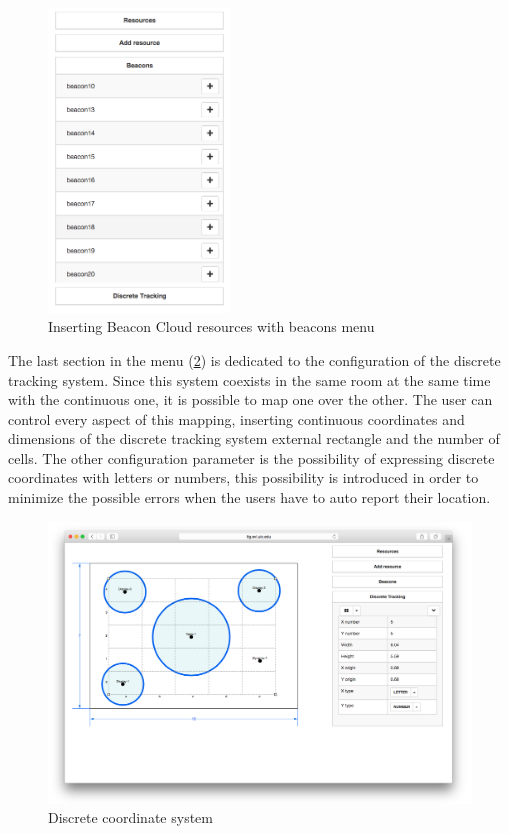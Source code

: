 \begin{figure}
\centering
\includegraphics[width=1.9in]{images/classroom-layout-beacons.png}
\caption{Inserting Beacon Cloud resources with beacons menu}
\label{fig:classroom_layout_beacons}
\end{figure}

The last section in the menu (\ref{fig:classroom_layout_discrete}) is dedicated to the configuration of the discrete tracking system. Since this system coexists in the same room at the same time with the continuous one, it is possible to map one over the other. The user can control every aspect of this mapping, inserting continuous coordinates and dimensions of the discrete tracking system external rectangle and the number of cells. The other configuration parameter is the possibility of expressing discrete coordinates with letters or numbers, this possibility is introduced in order to minimize the possible errors when the users have to auto report their location.

\begin{figure}
\centering
\includegraphics[width=4.5in]{images/classroom-layout-discrete.png}
\caption{Discrete coordinate system}
\label{fig:classroom_layout_discrete}
\end{figure}

